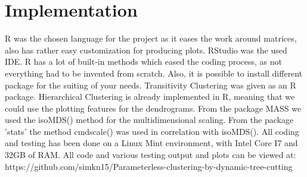 \documentclass[a4paper,10pt]{article}
\theoremstyle{plain}
\theoremstyle{definition}
\begin{document}
\newpage
\section{Implementation}
R was the chosen language for the project as it eases the work around matrices, also has rather easy customization for producing plots. RStudio was the used IDE. R has a lot of built-in methods which eased the coding process, as not everything had to be invented from scratch. Also, it is possible to install different package for the suiting of your needs. Transitivity Clustering was given as an R package. Hierarchical Clustering is already implemented in R, meaning that we could use the plotting features for the dendrograms. From the package MASS we used the isoMDS() method for the multidimensional scaling. From the package 'stats' the method cmdscale() was used in correlation with isoMDS(). All coding and testing has been done on a Linux Mint environment, with Intel Core I7 and 32GB of RAM.
All code and various testing output and plots can be viewed at: https://github.com/simkn15/Parameterless-clustering-by-dynamic-tree-cutting

\newpage
\end{document}
